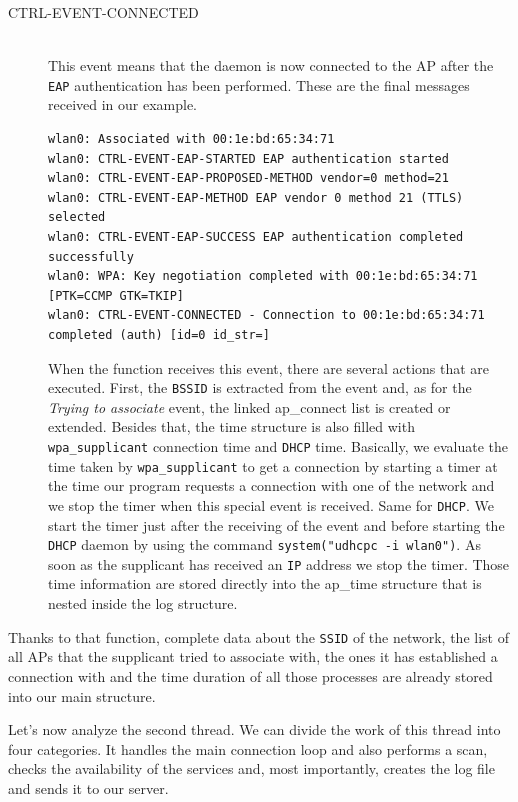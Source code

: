 \begin{description}
	\item[CTRL-EVENT-CONNECTED]\hfill \\
	This event means that the daemon is now connected to the AP after the \texttt{EAP} authentication has been performed. These are the final messages received in our example.\\

\begin{lstlisting}[frame=single,breaklines=true,caption={Example of a connection to the \texttt{student.UCLouvain} network}]
wlan0: Associated with 00:1e:bd:65:34:71
wlan0: CTRL-EVENT-EAP-STARTED EAP authentication started
wlan0: CTRL-EVENT-EAP-PROPOSED-METHOD vendor=0 method=21
wlan0: CTRL-EVENT-EAP-METHOD EAP vendor 0 method 21 (TTLS) selected
wlan0: CTRL-EVENT-EAP-SUCCESS EAP authentication completed successfully
wlan0: WPA: Key negotiation completed with 00:1e:bd:65:34:71 [PTK=CCMP GTK=TKIP]
wlan0: CTRL-EVENT-CONNECTED - Connection to 00:1e:bd:65:34:71 completed (auth) [id=0 id_str=]
\end{lstlisting}
When the function receives this event, there are several actions that are executed. First, the \texttt{BSSID} is extracted from the event and, as for the \textit{Trying to associate} event, the linked ap\_connect list is created or extended. Besides that, the time structure is also filled with \texttt{wpa\_supplicant} connection time and \texttt{DHCP} time. Basically, we evaluate the time taken by \texttt{wpa\_supplicant} to get a connection by starting a timer at the time our program requests a connection with one of the network and we stop the timer when this special event is received. Same for \texttt{DHCP}. We start the timer just after the receiving of the event and before starting the \texttt{DHCP} daemon by using the command \texttt{system("udhcpc -i wlan0")}. As soon as the supplicant has received an \texttt{IP} address we stop the timer. Those time information are stored directly into the ap\_time structure that is nested inside the log structure.
\end{description}

Thanks to that function, complete data about the \texttt{SSID} of the network, the list of all APs that the supplicant tried to associate with, the ones it has established a connection with and the time duration of all those processes are already stored into our main structure.


Let's now analyze the second thread. We can divide the work of this thread into four categories. It handles the main connection loop and also performs a scan, checks the availability of the services and, most importantly, creates the log file and sends it to our server. 

